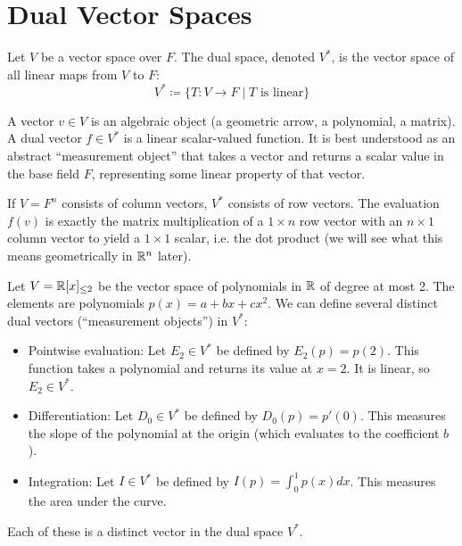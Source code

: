 \documentclass[../linear_algebra_and_groups.tex]{subfiles}
\begin{document}
\chapter{Dual Vector Spaces}

\begin{definition}
    \begin{shaded*}
        Let $V$ be a vector space over $F$. The dual space, denoted $V^*$, is the vector space of all linear maps from $V$ to $F$:
        \[ V^* \coloneqq \{T : V \to F \mid T \text{ is linear}\} \]
    \end{shaded*}
\end{definition}

\begin{remark}
    A vector $v \in V$ is an algebraic object (a geometric arrow, a polynomial, a matrix). A dual vector $f \in V^*$ is a linear scalar-valued function. It is best understood as an abstract ``measurement object'' that takes a vector and returns a scalar value in the base field $F$, representing some linear property of that vector.
    
    If $V = F^n$ consists of column vectors, $V^*$ consists of row vectors. The evaluation $f(v)$ is exactly the matrix multiplication of a $1 \times n$ row vector with an $n \times 1$ column vector to yield a $1 \times 1$ scalar, i.e. the dot product (we will see what this means geometrically in $\mathbb{R}^n$ later).
\end{remark}

\begin{example}
    Let $V = \mathbb{R}[x]_{\le 2}$ be the vector space of polynomials in $\mathbb{R}$ of degree at most 2. The elements are polynomials $p(x) = a + bx + cx^2$. 
    We can define several distinct dual vectors (``measurement objects'') in $V^*$:
    \begin{itemize}
        \item Pointwise evaluation: Let $E_2 \in V^*$ be defined by $E_2(p) = p(2)$. This function takes a polynomial and returns its value at $x=2$. It is linear, so $E_2 \in V^*$.
        \item Differentiation: Let $D_0 \in V^*$ be defined by $D_0(p) = p'(0)$. This measures the slope of the polynomial at the origin (which evaluates to the coefficient $b$).
        \item Integration: Let $I \in V^*$ be defined by $I(p) = \int_0^1 p(x) dx$. This measures the area under the curve.
    \end{itemize}
    Each of these is a distinct vector in the dual space $V^*$.
\end{example}
\end{document}
